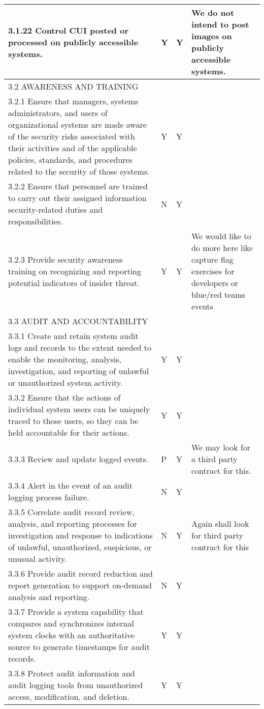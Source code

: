 \begin{longtable} {|p{}|p{}|p{}|p{} |}
{3.1.22 Control CUI posted or processed on publicly accessible systems.}&{Y}&{Y}&{We do not intend to post images on publicly accessible systems. } \\ \hline
{3.2 AWARENESS AND TRAINING}&&& \\ \hline
{3.2.1 Ensure that managers, systems administrators, and users of organizational systems are made aware of the security risks associated with their activities and of the applicable policies, standards, and procedures related to the security of those systems.}&{Y}&{Y}& \\ \hline
{3.2.2 Ensure that personnel are trained to carry out their assigned information security-related duties and responsibilities.}&{N}&{Y}& \\ \hline
{3.2.3 Provide security awareness training on recognizing and reporting potential indicators of insider threat.}&{Y}&{Y}&{We would like to do more here like capture flag exercises for developers or blue/red teams events} \\ \hline
{3.3 AUDIT AND ACCOUNTABILITY}&&& \\ \hline
{3.3.1 Create and retain system audit logs and records to the extent needed to enable the monitoring, analysis, investigation, and reporting of unlawful or unauthorized system activity.}&{Y}&{Y}& \\ \hline
{3.3.2 Ensure that the actions of individual system users can be uniquely traced to those users, so they can be held accountable for their actions.}&{Y}&{Y}& \\ \hline
{3.3.3 Review and update logged events.}&{P}&{Y}&{We may look for a third party contract for this.} \\ \hline
{3.3.4 Alert in the event of an audit logging process failure.}&{N}&{Y}& \\ \hline
{3.3.5 Correlate audit record review, analysis, and reporting processes for investigation and response to indications of unlawful, unauthorized, suspicious, or unusual activity.}&{N}&{Y}&{Again shall look for third party contract for this} \\ \hline
{3.3.6 Provide audit record reduction and report generation to support on-demand analysis and reporting.}&{N}&{Y}& \\ \hline
{3.3.7 Provide a system capability that compares and synchronizes internal system clocks with an authoritative source to generate timestamps for audit records.}&{Y}&{Y}& \\ \hline
{3.3.8 Protect audit information and audit logging tools from unauthorized access, modification, and deletion.}&{Y}&{Y}& \\ \hline

\end{longtable}
